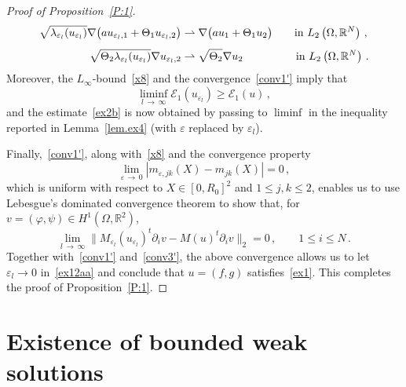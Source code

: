 \documentclass[AHL,Unicode,longabstracts,published]{cedram}
\newcommand{\bbR}{\mathbb{R}}
\newcommand{\clE}{\mathcal{E}}
\newcommand{\clE}{\mathcal{E}}
\begin{document}
\begin{proof}[Proof of Proposition~\ref{P:1}]
\begin{align*}
\sqrt{\lambda_{\varepsilon_l}(u_{\varepsilon_l})} \nabla \big(a u_{\varepsilon_l,1} + \Theta_1 u_{\varepsilon_l,2} \big) &
\rightharpoonup \nabla\big (a u_1 + \Theta_1 u_2\big) \qquad \text{in }L_2\left(\Omega,\bbR^{N}\right)\,, \\[1ex]
\sqrt{\Theta_2 \lambda_{\varepsilon_l}(u_{\varepsilon_l})} \nabla u_{\varepsilon_l,2} & \rightharpoonup \sqrt{\Theta_2}\nabla u_2 \mkern87mu \text{in }L_2\left(\Omega,\bbR^{N}\right)\,.
\end{align*}
Moreover, the $L_\infty$-bound~\eqref{x8} and the convergence~\eqref{conv1'} imply that
\begin{equation*}
\liminf_{l\,\to\,\infty} \clE_1(u_{\varepsilon_l}) \geq \clE_1(u)\,,
\end{equation*}
and the estimate~\eqref{ex2b} is now obtained by passing to $\liminf$ in the inequality reported in Lemma~\ref{lem.ex4} (with $\varepsilon$ replaced by $\varepsilon_l$).

Finally,~\eqref{conv1'}, along with~\eqref{x8} and the convergence property
\begin{equation*}
\lim_{\varepsilon\,\to\,0} \left| m_{\varepsilon,jk}(X) - m_{jk}(X) \right| = 0\,,
\end{equation*}
which is uniform with respect to $X\in [0,R_0]^2 $ and $1 \le j,k\le 2$, enables us to use Lebesgue's dominated convergence theorem to show that, for $v=(\varphi,\psi)\in H^1(\Omega,\bbR^2)$,
\begin{equation*}
\lim_{l\,\to\,\infty} \big\| M_{\varepsilon_l}(u_{\varepsilon_l})^t \partial_i v - M(u)^t \partial_i v \big\|_2 = 0\,, \qquad 1\le i \le N\,.
\end{equation*}
Together with~\eqref{conv1'} and~\eqref{conv3'}, the above convergence allows us to let $\varepsilon_l\to 0$ in~\eqref{ex12aa} and conclude that $u=(f,g)$ satisfies~\eqref{ex1}. This completes the proof of Proposition~\ref{P:1}.
\end{proof}



\section{Existence of bounded weak solutions}\label{sec3}
\end{document}
